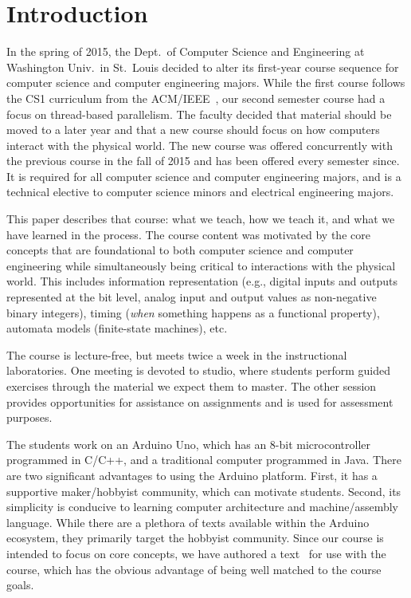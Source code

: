 \section{Introduction}
\label{sec:intro}

In the spring of 2015, the Dept.~of Computer Science and Engineering at
Washington Univ.~in St.~Louis decided to alter
its first-year course sequence for computer science and
computer engineering majors.  While the first course follows
the CS1 curriculum from the ACM/IEEE~\cite{cs13}, our second semester
course had a focus on thread-based parallelism.  The faculty
decided that material should be moved
to a later year and that a new course should focus on
how computers interact with the physical world.
The new course
was offered concurrently with the previous course in the
fall of 2015 and has been offered every semester since.
It is required for all computer science and computer engineering majors,
and is a technical elective to computer science minors and electrical
engineering majors.

This paper describes that course: what we teach, how we teach it, and
what we have learned in the process.  The course content was motivated by the core concepts that are foundational to both computer science and computer engineering while simultaneously being critical to interactions with the physical world.
This includes information representation (e.g., digital inputs
and outputs represented at the bit level, analog input and output values as
non-negative binary integers),
timing (\emph{when} something happens as a functional property),
automata models (finite-state machines), etc.

The course is lecture-free, but meets twice a week in the
instructional laboratories.  One meeting is devoted to studio, where students perform guided exercises through the material we
expect them to master. The other session provides opportunities for assistance on assignments and is used for assessment purposes.

The students work on an Arduino Uno, %
which has an 8-bit microcontroller programmed in C/C++,
and a traditional computer programmed in Java.
There are two significant advantages to using the Arduino platform.
First, it has a supportive maker/hobbyist community, which can motivate students.
Second, its simplicity is conducive to
learning computer architecture and machine/assembly language.
While there are a plethora of texts available within the Arduino
ecosystem, they primarily target the hobbyist community. Since
our course is intended to focus on core concepts, we have authored
a text~\cite{cc17} for use with the course, which has the obvious
advantage of being well matched to the course goals.

